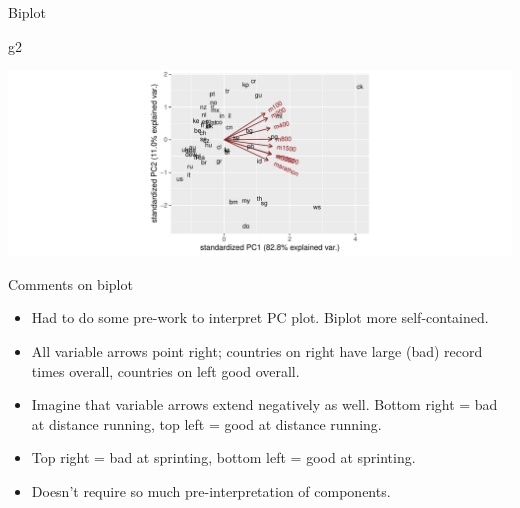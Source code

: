 \documentclass[
  ignorenonframetext,
]{beamer}
\newenvironment{Shaded}{\begin{snugshade}}{\end{snugshade}}
\newcommand{\NormalTok}[1]{#1}
\begin{document}
\begin{frame}[fragile]{Biplot}
\protect\hypertarget{biplot-3}{}

\begin{Shaded}
\begin{Highlighting}[]
\NormalTok{g2}
\end{Highlighting}
\end{Shaded}

\includegraphics{slides_d29_files/figure-beamer/biplot2-1.pdf}

\end{frame}

\begin{frame}{Comments on biplot}
\protect\hypertarget{comments-on-biplot}{}

\begin{itemize}
\item
  Had to do some pre-work to interpret PC plot. Biplot more
  self-contained.
\item
  All variable arrows point right; countries on right have large (bad)
  record times overall, countries on left good overall.
\item
  Imagine that variable arrows extend negatively as well. Bottom right =
  bad at distance running, top left = good at distance running.
\item
  Top right = bad at sprinting, bottom left = good at sprinting.
\item
  Doesn't require so much pre-interpretation of components.
\end{itemize}

\end{frame}
\end{document}
